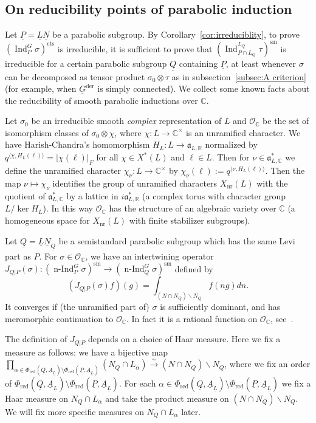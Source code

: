 \documentclass[a4paper]{amsart}
\numberwithin{equation}{section}
\theoremstyle{remark}
\theoremstyle{definition}
\DeclareMathOperator{\Ind}{Ind}
\DeclareMathOperator{\nInd}{n-Ind}
\newcommand{\C}{\mathbb{C}}
\newcommand{\R}{\mathbb{R}}
\newcommand{\sm}{\mathrm{sm}}
\newcommand{\alggrp}[1]{\underline{#1}}
\newcommand{\der}{\mathrm{der}}
\newcommand{\cts}{\mathrm{cts}}
\newcommand{\red}{\mathrm{red}}
\newcommand{\xnr}{X_{\mathrm{nr}}}
\newcommand{\ang}[1]{\langle #1\rangle}
\newcommand{\congto}{\xrightarrow{\,\sim\,}}
\begin{document}
\subsection{On reducibility points of parabolic induction}
\label{sec:reduc-points-parab}
Let $\alggrp{P} = \alggrp{L}\alggrp{N}$ be a parabolic subgroup.
By Corollary~\ref{cor:irreduciblity}, to prove $(\Ind_{P}^{G}\sigma)^{\cts}$ is irreducible, it is sufficient to prove that $(\Ind_{P \cap L_Q}^{L_Q}\tau)^{\sm}$ is irreducible for a certain parabolic subgroup $\alggrp Q$ containing $\alggrp P$, 
at least whenever $\sigma$ can be decomposed as tensor product $\sigma_{0}\otimes\tau$ as in subsection~\ref{subsec:A criterion} (for example, when $\alggrp G^\der$ is simply connected).
We collect some known facts about the reducibility of smooth parabolic inductions over $\C$.

Let $\sigma_0$ be an irreducible smooth \emph{complex} representation of $L$ and $\mathcal{O}_{\C}$ be the set of isomorphism classes of $\sigma_0\otimes\chi$, where $\chi\colon L\to \C^{\times}$ is an unramified character.
We have Harish-Chandra's homomorphism $H_{L} \colon L \to \mathfrak{a}_{L,\R}$ normalized by $q^{\ang{\chi,H_{L}(\ell)}} = \lvert\chi(\ell)\rvert_F$ for all $\chi \in X^*(\alggrp L)$ and $\ell \in L$.
Then for $\nu \in \mathfrak{a}_{L,\C}^*$ we define the unramified character $\chi_\nu \colon L \to \C^{\times}$ by $\chi_\nu(\ell) := q^{\ang{\nu,H_{L}(\ell)}}$.
Then the map $\nu \mapsto \chi_\nu$ identifies the group of unramified characters $\xnr(L)$ with the quotient of $\mathfrak{a}_{L,\C}^{*}$ by a lattice in $i\mathfrak{a}_{L,\R}^{*}$
(a complex torus with character group $L/\ker H_L$).
In this way $\mathcal{O}_{\C}$ has the structure of an algebraic variety over $\C$ (a homogeneous space for $\xnr(L)$ with finite stabilizer subgroups).


Let $\alggrp{Q} = \alggrp{L}\alggrp{N}_{\alggrp Q}$ be a semistandard parabolic subgroup which has the same Levi part as $P$.
For $\sigma\in \mathcal{O}_{\C}$, we have an intertwining operator $J_{Q|P}(\sigma)\colon (\nInd_{P}^{G}\sigma)^{\sm}\to (\nInd_{Q}^{G}\sigma)^{\sm}$ defined by
\[
(J_{Q|P}(\sigma)f)(g) = \int_{(N \cap N_{Q})\backslash N_{Q}}f(ng)dn.
\]
It converges if (the unramified part of) $\sigma$ is sufficiently dominant, and has meromorphic continuation to $\mathcal{O}_{\C}$.
In fact it is a rational function on $\mathcal{O}_{\C}$, see~\cite[Th\'eor\`eme~IV.1.1]{MR1989693}.

The definition of $J_{Q|P}$ depends on a choice of Haar measure.
Here we fix a measure as follows: we have a bijective map $\prod_{\alpha\in \Phi_{\red}(\alggrp{Q},\alggrp{A}_{\alggrp{L}}) \setminus \Phi_{\red}(\alggrp{P},\alggrp{A}_{\alggrp{L}})}(N_Q \cap L_{\alpha})\congto (N \cap N_{Q})\backslash N_{Q}$, where we fix an order of $\Phi_{\red}(\alggrp{Q},\alggrp{A}_{\alggrp{L}}) \setminus \Phi_{\red}(\alggrp{P},\alggrp{A}_{\alggrp{L}})$.
For each $\alpha\in\Phi_{\red}(\alggrp{Q},\alggrp{A}_{\alggrp{L}}) \setminus \Phi_{\red}(\alggrp{P},\alggrp{A}_{\alggrp{L}})$ we fix a Haar measure on $N_Q \cap L_{\alpha}$ and take the product measure on $(N \cap N_{Q})\backslash N_{Q}$.
We will fix more specific measures on $N_{Q}\cap L_{\alpha}$ later.
\end{document}
